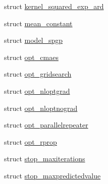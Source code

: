 \begin{DoxyCompactItemize}
\item 
struct \hyperlink{structlimbo_1_1defaults_1_1kernel__squared__exp__ard}{kernel\+\_\+squared\+\_\+exp\+\_\+ard}
\item 
struct \hyperlink{structlimbo_1_1defaults_1_1mean__constant}{mean\+\_\+constant}
\item 
struct \hyperlink{structlimbo_1_1defaults_1_1model__spgp}{model\+\_\+spgp}
\item 
struct \hyperlink{structlimbo_1_1defaults_1_1opt__cmaes}{opt\+\_\+cmaes}
\item 
struct \hyperlink{structlimbo_1_1defaults_1_1opt__gridsearch}{opt\+\_\+gridsearch}
\item 
struct \hyperlink{structlimbo_1_1defaults_1_1opt__nloptgrad}{opt\+\_\+nloptgrad}
\item 
struct \hyperlink{structlimbo_1_1defaults_1_1opt__nloptnograd}{opt\+\_\+nloptnograd}
\item 
struct \hyperlink{structlimbo_1_1defaults_1_1opt__parallelrepeater}{opt\+\_\+parallelrepeater}
\item 
struct \hyperlink{structlimbo_1_1defaults_1_1opt__rprop}{opt\+\_\+rprop}
\item 
struct \hyperlink{structlimbo_1_1defaults_1_1stop__maxiterations}{stop\+\_\+maxiterations}
\item 
struct \hyperlink{structlimbo_1_1defaults_1_1stop__maxpredictedvalue}{stop\+\_\+maxpredictedvalue}
\end{DoxyCompactItemize}
